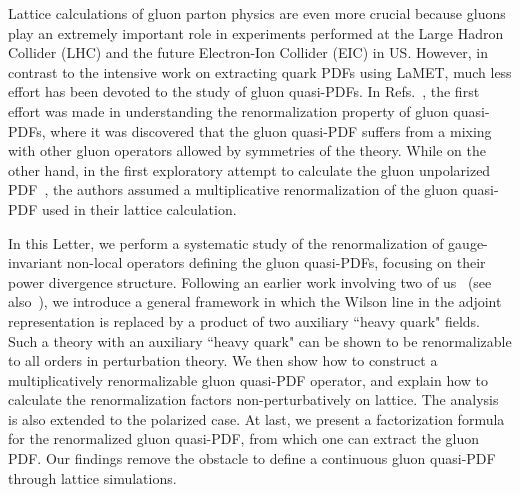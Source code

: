 Lattice calculations of gluon parton physics are even more crucial because gluons play an extremely important role in experiments performed at the Large Hadron Collider (LHC) and the future Electron-Ion Collider (EIC) in US. However,
in contrast to the intensive work on extracting quark PDFs using LaMET, much less effort has been devoted to the study of gluon quasi-PDFs.
In Refs.~\cite{Wang:2017qyg,Wang:2017eel}, the first effort was made in understanding the renormalization property of gluon quasi-PDFs, where it was discovered that the gluon quasi-PDF suffers from a mixing with other gluon operators allowed by symmetries of the theory. While on the other hand, in the first exploratory attempt to calculate the gluon unpolarized PDF~\cite{Fan:2018dxu}, the authors assumed a multiplicative renormalization of the gluon quasi-PDF used in their lattice calculation.

In this Letter, we perform a systematic study of the renormalization of gauge-invariant non-local operators defining the gluon quasi-PDFs, focusing on their
power divergence structure. Following an earlier work involving two of us~\cite{Ji:2017oey} (see also~\cite{Ishikawa:2017faj,Green:2017xeu}), we introduce a general framework in which the Wilson line in the adjoint representation is replaced by a product of two auxiliary ``heavy quark" fields. Such a theory with an auxiliary ``heavy quark" can be shown to be renormalizable to all orders in perturbation theory.
We then show how to construct a multiplicatively renormalizable gluon quasi-PDF operator, and explain how to calculate the renormalization factors non-perturbatively on lattice. The analysis is also extended to the polarized case. At last, we present a factorization formula for the renormalized gluon quasi-PDF, from which one can extract the gluon PDF. Our findings remove the obstacle to define a continuous gluon quasi-PDF through lattice simulations.
